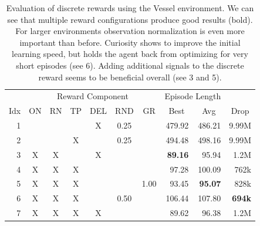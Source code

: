 \begin{table}[htp]
    \begin{center}
        \begin{tabular}{rccccccrrr}
            \toprule
             & \multicolumn{6}{c}{Reward Component} & \multicolumn{2}{c}{Episode Length} & \\
            \cmidrule(lr){2-7}\cmidrule(lr){8-9}
            \multicolumn{1}{c}{Idx} & \multicolumn{1}{c}{ON} & \multicolumn{1}{c}{RN} & \multicolumn{1}{c}{TP} & \multicolumn{1}{c}{DEL} & \multicolumn{1}{c}{RND} & \multicolumn{1}{c}{GR} & \multicolumn{1}{c}{Best} & \multicolumn{1}{c}{Avg} & \multicolumn{1}{c}{Drop}\\
            \midrule
            1 &  &  &  & X & 0.25 &  & 479.92 & 486.21 & 9.99M \\
            2 &  &  & X &  & 0.25 &  & 494.48 & 498.16 & 9.99M \\
            3 & X & X &  & X &  &  & \textbf{89.16} & 95.94 & 1.2M \\
            4 & X & X & X &  &  &  & 97.28 & 100.09 & 762k \\
            5 & X & X & X &  &  & 1.00 & 93.45 & \textbf{95.07} & 828k \\
            6 & X & X & X &  & 0.50 &  & 106.44 & 107.80 & \textbf{694k} \\
            7 & X & X & X & X &  &  & 89.62 & 96.38 & 1.2M \\
            \bottomrule
        \end{tabular}
    \end{center}
    \caption[Evaluation of Discrete Rewards using the Vessel Environment]{Evaluation of discrete rewards using the Vessel environment. We can see that multiple reward configurations produce good results (bold). For larger environments observation normalization is even more important than before. Curiosity shows to improve the initial learning speed, but holds the agent back from optimizing for very short episodes (see 6). Adding additional signals to the discrete reward seems to be beneficial overall (see 3 and 5).} \label{tab:VesselMaze02/Reward/Discrete}
\end{table}

